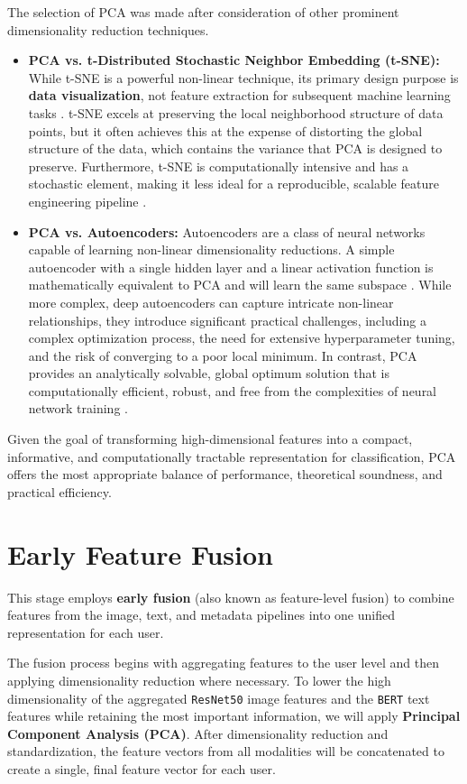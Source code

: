 The selection of PCA was made after consideration of other prominent dimensionality reduction techniques.
\begin{itemize}
	\item \textbf{PCA vs. t-Distributed Stochastic Neighbor Embedding (t-SNE):} While t-SNE is a powerful non-linear technique, its primary design purpose is \textbf{data visualization}, not feature extraction for subsequent machine learning tasks \citep{van2008visualizing}. t-SNE excels at preserving the local neighborhood structure of data points, but it often achieves this at the expense of distorting the global structure of the data, which contains the variance that PCA is designed to preserve. Furthermore, t-SNE is computationally intensive and has a stochastic element, making it less ideal for a reproducible, scalable feature engineering pipeline \citep{van2008visualizing}.
	
	\item \textbf{PCA vs. Autoencoders:} Autoencoders are a class of neural networks capable of learning non-linear dimensionality reductions. A simple autoencoder with a single hidden layer and a linear activation function is mathematically equivalent to PCA and will learn the same subspace \citep{bourlard1988}. While more complex, deep autoencoders can capture intricate non-linear relationships, they introduce significant practical challenges, including a complex optimization process, the need for extensive hyperparameter tuning, and the risk of converging to a poor local minimum. In contrast, PCA provides an analytically solvable, global optimum solution that is computationally efficient, robust, and free from the complexities of neural network training \citep{bourlard1988}.
\end{itemize}
Given the goal of transforming high-dimensional features into a compact, informative, and computationally tractable representation for classification, PCA offers the most appropriate balance of performance, theoretical soundness, and practical efficiency.

\section{Early Feature Fusion}
\label{subsec:fusion}
This stage employs \textbf{early fusion} (also known as feature-level fusion) to combine features from the image, text, and metadata pipelines into one unified representation for each user.

The fusion process begins with aggregating features to the user level and then applying dimensionality reduction where necessary. To lower the high dimensionality of the aggregated \texttt{ResNet50} image features and the \texttt{BERT} text features while retaining the most important information, we will apply \textbf{Principal Component Analysis (PCA)}. After dimensionality reduction and standardization, the feature vectors from all modalities will be concatenated to create a single, final feature vector for each user.

